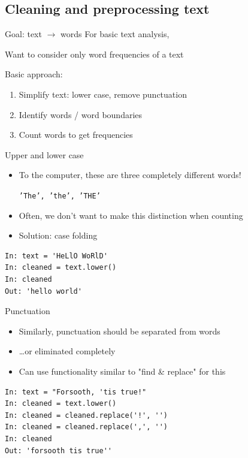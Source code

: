 \documentclass[aspectratio=169,usenames,dvipsnames]{beamer}
\begin{document}
\subsection{Cleaning and preprocessing text}
\begin{frame}{Goal: text $\rightarrow$ words}
    For basic text analysis,

    Want to consider only word frequencies of a text

    \vspace{1em}
    Basic approach:
    \begin{enumerate}
        \item Simplify text: lower case, remove punctuation
        \item Identify words / word boundaries
        \item Count words to get frequencies
    \end{enumerate}
\end{frame}


\begin{frame}[fragile]{Upper and lower case}
    \begin{itemize}
        \item To the computer, these
            are three completely different words!

            \texttt{'The', 'the', 'THE'}
        \item Often, we don't want to make this distinction when counting
        \item Solution: case folding
    \end{itemize}
    \pause
\begin{lstlisting}
In: text = 'HeLlO WoRlD'
In: cleaned = text.lower()
In: cleaned
Out: 'hello world'
\end{lstlisting}
\end{frame}

\begin{frame}[fragile]{Punctuation}
    \begin{itemize}
        \item Similarly, punctuation should be separated from words
        \item \dots or eliminated completely
        \item Can use functionality similar to "find \& replace" for this
    \end{itemize}
    \pause
\begin{lstlisting}
In: text = "Forsooth, 'tis true!"
In: cleaned = text.lower()
In: cleaned = cleaned.replace('!', '')
In: cleaned = cleaned.replace(',', '')
In: cleaned
Out: 'forsooth tis true''
\end{lstlisting}
\end{frame}
\end{document}
